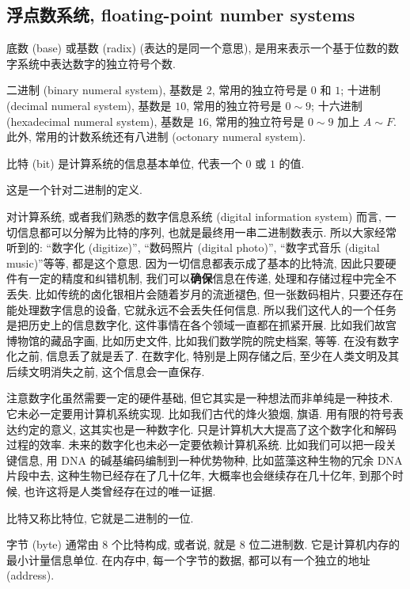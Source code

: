 \documentclass[a4paper]{ctexart}
\begin{document}
{\subsection{浮点数系统, floating-point number systems}

 底数 (base) 或基数 (radix) (表达的是同一个意思),
是用来表示一个基于位数的数字系统中表达数字的独立符号个数.

 二进制 (binary numeral system), 基数是 $2$,
常用的独立符号是 $0$ 和 $1$; 十进制 (decimal numeral system),
基数是 $10$, 常用的独立符号是 $0 \sim 9$; 十六进制
(hexadecimal numeral system), 基数是 $16$, 常用的独立符号是
$0 \sim 9$ 加上 $A \sim F$. 此外, 常用的计数系统还有八进制
(octonary numeral system). 

 比特 (bit) 是计算系统的信息基本单位,
代表一个 $0$ 或 $1$ 的值.

这是一个针对二进制的定义. 

对计算系统, 或者我们熟悉的数字信息系统
(digital information system) 而言, 一切信息都可以分解为比特的序列,
也就是最终用一串二进制数表示. 所以大家经常听到的: ``数字化 (digitize)'',
``数码照片 (digital photo)'', ``数字式音乐 (digital music)''等等,
都是这个意思. 因为一切信息都表示成了基本的比特流,
因此只要硬件有一定的精度和纠错机制, 我们可以{\bf 确保}信息在传递,
处理和存储过程中完全不丢失. 比如传统的卤化银相片会随着岁月的流逝褪色,
但一张数码相片, 只要还存在能处理数字信息的设备, 它就永远不会丢失任何信息.
所以我们这代人的一个任务是把历史上的信息数字化, 这件事情在各个领域一直都在抓紧开展.
比如我们故宫博物馆的藏品字画, 比如历史文件, 比如我们数学院的院史档案, 等等.
在没有数字化之前, 信息丢了就是丢了. 在数字化, 特别是上网存储之后,
至少在人类文明及其后续文明消失之前, 这个信息会一直保存.

注意数字化虽然需要一定的硬件基础, 但它其实是一种想法而非单纯是一种技术.
它未必一定要用计算机系统实现. 比如我们古代的烽火狼烟, 旗语. 用有限的符号表达约定的意义,
这其实也是一种数字化. 只是计算机大大提高了这个数字化和解码过程的效率.
未来的数字化也未必一定要依赖计算机系统. 比如我们可以把一段关键信息,
用 DNA 的碱基编码编制到一种优势物种, 比如蓝藻这种生物的冗余 DNA 片段中去,
这种生物已经存在了几十亿年, 大概率也会继续存在几十亿年, 到那个时候,
也许这将是人类曾经存在过的唯一证据.

比特又称比特位, 它就是二进制的一位.

 字节 (byte) 通常由 $8$ 个比特构成, 或者说,
就是 $8$ 位二进制数. 它是计算机内存的最小计量信息单位. 在内存中, 每一个字节的数据,
都可以有一个独立的地址 (address).

}
\end{document}
